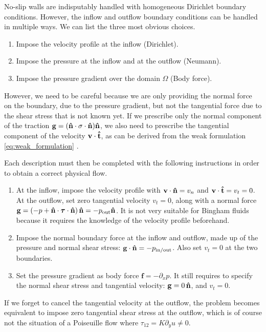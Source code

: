 \documentclass[11 pt]{report}
\begin{document}
No-slip walls are indisputably handled with homogeneous Dirichlet boundary conditions. However, the inflow and outflow boundary conditions can be handled in multiple ways. We can list the three most obvious choices.
\begin{enumerate}
    \item Impose the velocity profile at the inflow (Dirichlet).
    \item Impose the pressure at the inflow and at the outflow (Neumann).
    \item Impose the pressure gradient over the domain $\Omega$ (Body force).
\end{enumerate}

However, we need to be careful because we are only providing the normal force on the boundary, due to the pressure gradient, but not the tangential force due to the shear stress that is not known yet. If we prescribe only the normal component of the traction $\mathbf{g}=(\mathbf{\hat n}\cdot\mathbf{\sigma}\cdot\mathbf{\hat n})\mathbf{\hat n}$, we also need to prescribe the tangential component of the velocity $\mathbf{v}\cdot\mathbf{\hat t}$, as can be derived from the weak formulation \cref{eq:weak_formulation} \cite{Bangerth}.

Each description must then be completed with the following instructions in order to obtain a correct physical flow.
\begin{enumerate}[topsep=0pt]
    \setlength{\itemsep}{0pt}
    \item At the inflow, impose the velocity profile with $\mathbf{v} \cdot \mathbf{\hat n} = v_n$ and $\mathbf{v} \cdot \mathbf{\hat t} = v_t = 0$. At the outflow, set zero tangential velocity $v_t = 0$, along with a normal force $\mathbf{g} = (-p + \mathbf{\hat n}\cdot\boldsymbol\tau\cdot\mathbf{\hat n})\,\mathbf{\hat n} = -p_{\text{out}}\mathbf{\hat n}$. It is not very suitable for Bingham fluids because it requires the knowledge of the velocity profile beforehand.
    \item Impose the normal boundary force at the inflow and outflow, made up of the pressure and normal shear stress: $\mathbf{g} \cdot \mathbf{\hat n} = -p_{\text{in/out}}$. Also set $v_t=0$ at the two boundaries.
    \item Set the pressure gradient as body force $\mathbf{f} = -\partial_x p$. It still requires to specify the normal shear stress and tangential velocity: $\mathbf{g} = 0 \,\mathbf{\hat n}$, and $v_t=0$.
\end{enumerate}

If we forget to cancel the tangential velocity at the outflow, the problem becomes equivalent to impose zero tangential shear stress at the outflow, which is of course not the situation of a Poiseuille flow where $\tau_{12} = K\partial_y u \neq 0$. 
\end{document}
